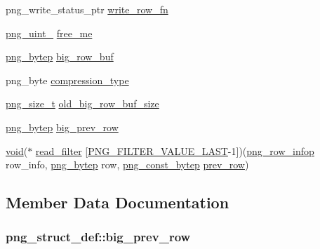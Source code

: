 \begin{DoxyCompactItemize}
\item 
png\+\_\+write\+\_\+status\+\_\+ptr \hyperlink{structpng__struct__def_a1ea44e185e0f8bdd7299f93fd017c32c}{write\+\_\+row\+\_\+fn}
\item 
\hyperlink{pngrutil_8c_a89824d0e9f0724e3e7799b01a2b5fe58}{png\+\_\+uint\+\_} \hyperlink{structpng__struct__def_a610bea16ff780c149d2756b60d2e6087}{free\+\_\+me}
\item 
\hyperlink{pngconf_8h_a759e1c893f977ec7b67820bc3ca37524}{png\+\_\+bytep} \hyperlink{structpng__struct__def_a7248deb9bb1525d1d16ee9d6187128b9}{big\+\_\+row\+\_\+buf}
\item 
png\+\_\+byte \hyperlink{structpng__struct__def_ad448c2648c447212ff66a0ec48cf1394}{compression\+\_\+type}
\item 
\hyperlink{pngconf_8h_a975e35d0a699ea3b08b8feef90fd29eb}{png\+\_\+size\+\_\+t} \hyperlink{structpng__struct__def_a42a732b3edf3c2fae816610beb949cc5}{old\+\_\+big\+\_\+row\+\_\+buf\+\_\+size}
\item 
\hyperlink{pngconf_8h_a759e1c893f977ec7b67820bc3ca37524}{png\+\_\+bytep} \hyperlink{structpng__struct__def_a58ed983872249c948e063743eb18d427}{big\+\_\+prev\+\_\+row}
\item 
\hyperlink{png_8h_aa8c59027f9ab2769342f248709d68d17}{void}($\ast$ \hyperlink{structpng__struct__def_a669016ed081452035d16f3a93740d663}{read\+\_\+filter} \mbox{[}\hyperlink{png_8h_a9bcc6cc30ac1504e9c194b890c17ad94}{P\+N\+G\+\_\+\+F\+I\+L\+T\+E\+R\+\_\+\+V\+A\+L\+U\+E\+\_\+\+L\+A\+S\+T}-\/1\mbox{]})(\hyperlink{png_8h_a5c04feca9d1d83a2fd29909c50327dd9}{png\+\_\+row\+\_\+infop} row\+\_\+info, \hyperlink{pngconf_8h_a759e1c893f977ec7b67820bc3ca37524}{png\+\_\+bytep} row, \hyperlink{pngconf_8h_a2e608af822427492832d11909c2f3fee}{png\+\_\+const\+\_\+bytep} \hyperlink{structpng__struct__def_af307f45d48c7900d1036388bccbed7bb}{prev\+\_\+row})
\end{DoxyCompactItemize}


\subsection{Member Data Documentation}
\hypertarget{structpng__struct__def_a58ed983872249c948e063743eb18d427}{}
\subsubsection[{big\+\_\+prev\+\_\+row}]{ png\+\_\+struct\+\_\+def\+::big\+\_\+prev\+\_\+row}\label{structpng__struct__def_a58ed983872249c948e063743eb18d427}
\hypertarget{structpng__struct__def_a7248deb9bb1525d1d16ee9d6187128b9}{}
